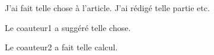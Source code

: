 \label{SpatialBoundaries}

\contributions%
{ J'ai fait telle chose à l'article. J'ai rédigé telle partie etc.


    Le coauteur1 a suggéré telle chose.

    Le coauteur2 a fait telle calcul.\\[1cm]
}


